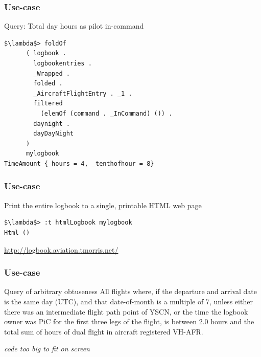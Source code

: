 \begin{frame}[fragile]
\frametitle{Use-case}
\begin{block}{Query: Total day hours as pilot in-command}
\begin{lstlisting}[style=haskell,basicstyle=\scriptsize\ttfamily,mathescape]
$\lambda$> foldOf
      ( logbook .
        logbookentries .
        _Wrapped .
        folded .
        _AircraftFlightEntry . _1 .
        filtered
          (elemOf (command . _InCommand) ()) .
        daynight .
        dayDayNight
      )
      mylogbook
TimeAmount {_hours = 4, _tenthofhour = 8}
\end{lstlisting}
\end{block}
\end{frame}

\begin{frame}[fragile]
\frametitle{Use-case}
\begin{block}{Print the entire logbook to a single, printable HTML web page}
\begin{lstlisting}[style=haskell,mathescape]
$\lambda$> :t htmlLogbook mylogbook
Html ()
\end{lstlisting}
\end{block}
\href{http://logbook.aviation.tmorris.net/}{http://logbook.aviation.tmorris.net/}
\end{frame}

\begin{frame}[fragile]
\frametitle{Use-case}
\begin{block}{Query of arbitrary obtuseness}
All flights where, if the departure and arrival date is the same day (UTC), and that date-of-month is a multiple of 7, unless either there was an intermediate flight path point of YSCN, or the time the logbook owner was PiC for the first three legs of the flight, is between 2.0 hours and the total sum of hours of dual flight in aircraft registered VH-AFR.

\emph{code too big to fit on screen}
\end{block}
\end{frame}

